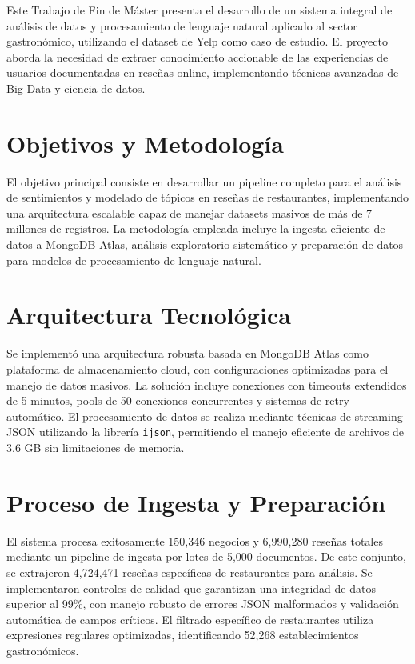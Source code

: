 \documentclass[12pt,a4paper,twoside,openany]{book}
\begin{document}
Este Trabajo de Fin de Máster presenta el desarrollo de un sistema integral de análisis de datos y procesamiento de lenguaje natural aplicado al sector gastronómico, utilizando el dataset de Yelp como caso de estudio. El proyecto aborda la necesidad de extraer conocimiento accionable de las experiencias de usuarios documentadas en reseñas online, implementando técnicas avanzadas de Big Data y ciencia de datos.

\section*{Objetivos y Metodología}

El objetivo principal consiste en desarrollar un pipeline completo para el análisis de sentimientos y modelado de tópicos en reseñas de restaurantes, implementando una arquitectura escalable capaz de manejar datasets masivos de más de 7 millones de registros. La metodología empleada incluye la ingesta eficiente de datos a MongoDB Atlas, análisis exploratorio sistemático y preparación de datos para modelos de procesamiento de lenguaje natural.

\section*{Arquitectura Tecnológica}

Se implementó una arquitectura robusta basada en MongoDB Atlas como plataforma de almacenamiento cloud, con configuraciones optimizadas para el manejo de datos masivos. La solución incluye conexiones con timeouts extendidos de 5 minutos, pools de 50 conexiones concurrentes y sistemas de retry automático. El procesamiento de datos se realiza mediante técnicas de streaming JSON utilizando la librería \texttt{ijson}, permitiendo el manejo eficiente de archivos de 3.6 GB sin limitaciones de memoria.

\section*{Proceso de Ingesta y Preparación}

El sistema procesa exitosamente 150,346 negocios y 6,990,280 reseñas totales mediante un pipeline de ingesta por lotes de 5,000 documentos. De este conjunto, se extrajeron 4,724,471 reseñas específicas de restaurantes para análisis. Se implementaron controles de calidad que garantizan una integridad de datos superior al 99\%, con manejo robusto de errores JSON malformados y validación automática de campos críticos. El filtrado específico de restaurantes utiliza expresiones regulares optimizadas, identificando 52,268 establecimientos gastronómicos.
\end{document}
